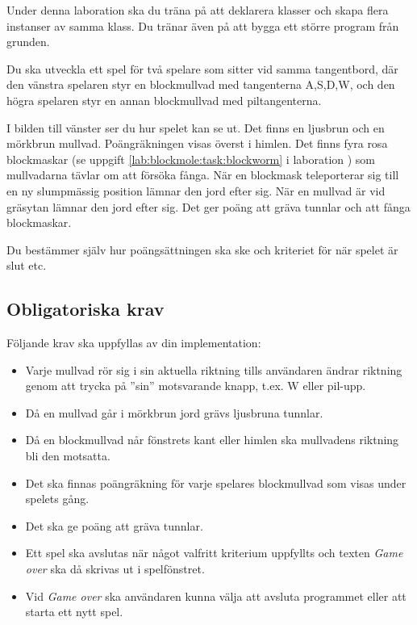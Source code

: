 {
\setlength{\currentparskip}{\parskip}%
\setlength{\currentparindent}{\parindent}%
\hfill%
\begin{minipage}{0.4\textwidth}
\setlength{\parskip}{\currentparskip}%
\setlength{\parindent}{\currentparindent}%
\noindent Under denna laboration ska du träna på att deklarera klasser och skapa flera instanser av samma klass. Du tränar även på att bygga ett större program från grunden.

Du ska utveckla ett spel för två spelare som sitter vid samma tangentbord, där den vänstra spelaren styr en blockmullvad med tangenterna A,S,D,W, och den högra spelaren styr en annan blockmullvad med piltangenterna.

I bilden till vänster ser du hur spelet kan se ut. Det finns en ljusbrun och en mörkbrun mullvad. Poängräkningen visas överst i himlen. Det finns fyra rosa blockmaskar (se uppgift \ref{lab:blockmole:task:blockworm} i laboration ) som mullvadarna tävlar om att försöka fånga. När en blockmask teleporterar sig till en ny slumpmässig position lämnar den jord efter sig. När en mullvad är vid gräsytan lämnar den jord efter sig.
Det ger poäng att gräva tunnlar och att fånga blockmaskar.

Du bestämmer själv hur poängsättningen ska ske och kriteriet för när spelet är slut etc.
\end{minipage}%
}



\subsection{Obligatoriska krav}

Följande krav ska uppfyllas av din implementation:
\begin{itemize}[nosep, label={$\square$},]
\item Varje mullvad rör sig i sin aktuella riktning tills användaren ändrar riktning genom att trycka på ''sin'' motsvarande knapp, t.ex. W eller pil-upp.
\item Då en mullvad går i mörkbrun jord grävs ljusbruna tunnlar.
\item Då en blockmullvad når fönstrets kant eller himlen ska mullvadens riktning bli den motsatta.
\item Det ska finnas poängräkning för varje spelares blockmullvad som visas under spelets gång.
\item Det ska ge poäng att gräva tunnlar.
\item Ett spel ska avslutas när något valfritt kriterium uppfyllts och texten \emph{Game over} ska då skrivas ut i spelfönstret.
\item Vid \emph{Game over} ska användaren kunna välja att avsluta programmet eller att starta ett nytt spel.
\end{itemize}

